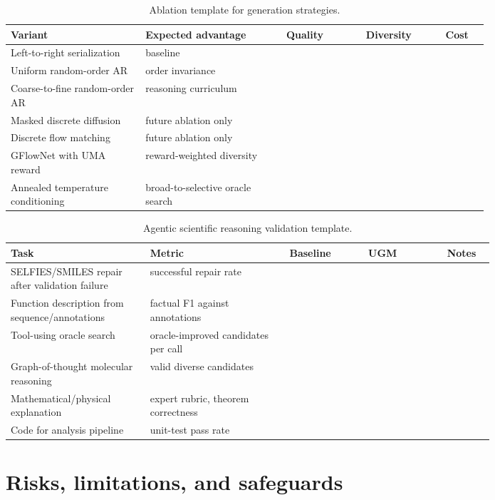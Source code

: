\documentclass[11pt]{article}
\newcommand{\1}{\mathbf{1}}
\newcommand{\UGM}{\textsc{UGM}}
\begin{document}
\begin{table}[H]
\centering
\caption{Ablation template for generation strategies.}
\scriptsize
\setlength{\tabcolsep}{3pt}
\begin{tabular}{p{0.22\linewidth}p{0.23\linewidth}p{0.13\linewidth}p{0.13\linewidth}p{0.07\linewidth}}
\toprule
Variant & Expected advantage & Quality & Diversity & Cost \\
\midrule
Left-to-right serialization & baseline & & & \\
Uniform random-order AR & order invariance & & & \\
Coarse-to-fine random-order AR & reasoning curriculum & & & \\
Masked discrete diffusion & future ablation only & & & \\
Discrete flow matching & future ablation only & & & \\
GFlowNet with UMA reward & reward-weighted diversity & & & \\
Annealed temperature conditioning & broad-to-selective oracle search & & & \\
\bottomrule
\end{tabular}
\end{table}

\begin{table}[H]
\centering
\caption{Agentic scientific reasoning validation template.}
\scriptsize
\setlength{\tabcolsep}{3pt}
\begin{tabular}{p{0.23\linewidth}p{0.23\linewidth}p{0.13\linewidth}p{0.13\linewidth}p{0.07\linewidth}}
\toprule
Task & Metric & Baseline & \UGM & Notes \\
\midrule
SELFIES/SMILES repair after validation failure & successful repair rate & & & \\
Function description from sequence/annotations & factual F1 against annotations & & & \\
Tool-using oracle search & oracle-improved candidates per call & & & \\
Graph-of-thought molecular reasoning & valid diverse candidates & & & \\
Mathematical/physical explanation & expert rubric, theorem correctness & & & \\
Code for analysis pipeline & unit-test pass rate & & & \\
\bottomrule
\end{tabular}
\end{table}

\section{Risks, limitations, and safeguards}
\end{document}
